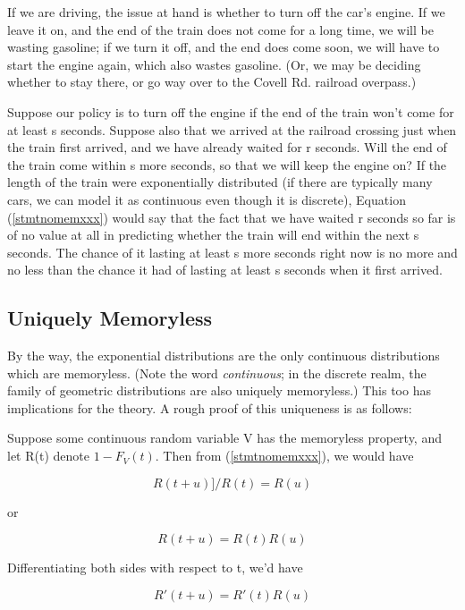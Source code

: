 If we are driving, the issue at hand is whether to turn off the car's
engine.  If we leave it on, and the end of the train does not come for a
long time, we will be wasting gasoline; if we turn it off, and the end
does come soon, we will have to start the engine again, which also
wastes gasoline.  (Or, we may be deciding whether to stay there, or go
way over to the Covell Rd. railroad overpass.)

Suppose our policy is to turn off the engine if the end of the train
won't come for at least s seconds. Suppose also that we arrived at the
railroad crossing just when the train first arrived, and we have already
waited for r seconds.  Will the end of the train come within s more
seconds, so that we will keep the engine on? If the length of the train
were exponentially distributed (if there are typically many cars, we can
model it as continuous even though it is discrete), Equation
(\ref{stmtnomemxxx}) would say that the fact that we have waited r seconds so
far is of no value at all in predicting whether the train will end
within the next s seconds. The chance of it lasting at least s more
seconds right now is no more and no less than the chance it had of
lasting at least s seconds when it first arrived.

\subsection{Uniquely Memoryless}

By the way, the exponential distributions are the only continuous
distributions which are memoryless.  (Note the word {\it continuous}; in
the discrete realm, the family of geometric distributions are also
uniquely memoryless.) This too has implications for the theory.  A rough
proof of this uniqueness is as follows:

Suppose some continuous random variable V has the memoryless property,
and let R(t) denote $1-F_V(t)$.  Then from (\ref{stmtnomemxxx}), we would
have 

\begin{equation}
R(t+u)]/R(t) = R(u)
\end{equation} 

or

\begin{equation}
R(t+u) = R(t) R(u)
\end{equation}

Differentiating both sides with respect to t, we'd have

\begin{equation}
R\prime(t+u) = R\prime(t) R(u)
\end{equation}

